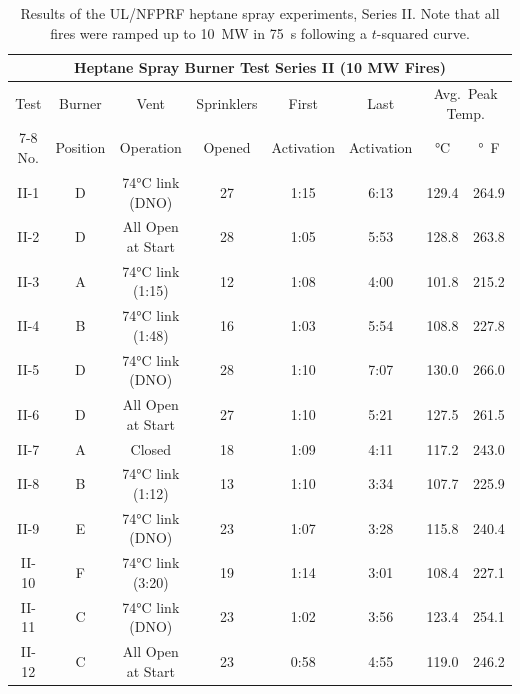 \begin{table}[ht!]
\centering
\caption[Results of the UL/NFPRF heptane spray experiments, Series~II]
{Results of the UL/NFPRF heptane spray experiments, Series II. Note that all fires were ramped up to 10~MW in 75~s following a $t$-squared curve.}
\label{ULburnermatrixII}
\begin{tabular}{|c||c|c|c|c|c|c|c|}
\hline
\multicolumn{8}{|c|}{\bf Heptane Spray Burner Test Series II (10 MW Fires)}\\ \hline \hline
Test & Burner   & Vent      & Sprinklers & First      & Last      & \multicolumn{2}{|c|}{Avg.~Peak Temp.} \\ \cline{7-8}
No.  & Position & Operation & Opened     & Activation & Activation & \unit{\degreeCelsius} & \unit{\degree F}   \\
\hline \hline
II-1  & D  & 74\unit{\degreeCelsius} link (DNO)  & 27 & 1:15 & 6:13 & 129.4 &264.9 \\ \hline
II-2  & D  & All Open at Start       & 28 & 1:05 & 5:53 & 128.8 &263.8 \\ \hline
II-3  & A  & 74\unit{\degreeCelsius} link (1:15) & 12 & 1:08 & 4:00 & 101.8 &215.2 \\ \hline
II-4  & B  & 74\unit{\degreeCelsius} link (1:48) & 16 & 1:03 & 5:54 & 108.8 &227.8 \\ \hline
II-5  & D  & 74\unit{\degreeCelsius} link (DNO)  & 28 & 1:10 & 7:07 & 130.0 &266.0 \\ \hline
II-6  & D  & All Open at Start       & 27 & 1:10 & 5:21 & 127.5 &261.5 \\ \hline
II-7  & A  & Closed                  & 18 & 1:09 & 4:11 & 117.2 &243.0 \\ \hline
II-8  & B  & 74\unit{\degreeCelsius} link (1:12) & 13 & 1:10 & 3:34 & 107.7 &225.9 \\ \hline
II-9  & E  & 74\unit{\degreeCelsius} link (DNO)  & 23 & 1:07 & 3:28 & 115.8 &240.4 \\ \hline
II-10 & F  & 74\unit{\degreeCelsius} link (3:20) & 19 & 1:14 & 3:01 & 108.4 &227.1 \\ \hline
II-11 & C  & 74\unit{\degreeCelsius} link (DNO)  & 23 & 1:02 & 3:56 & 123.4 &254.1 \\ \hline
II-12 & C  & All Open at Start       & 23 & 0:58 & 4:55 & 119.0 &246.2 \\ \hline
\end{tabular}
\end{table}


